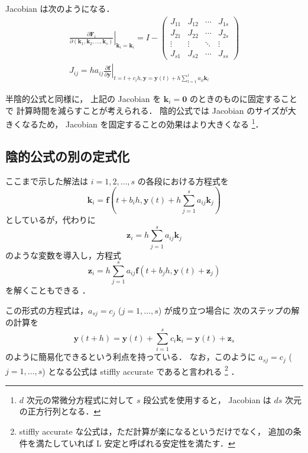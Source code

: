 Jacobian は次のようになる．
\begin{align}
    \left. \frac{\partial \bm{F}_i}{\partial (\bm{k}_1, \bm{k}_2, \ldots, \bm{k}_s)}
    \right|_{\bm{k}_i = \bm{k}_i}
    = I -
    \begin{pmatrix}
        J_{11} & J_{12} & \cdots & J_{1s} \\
        J_{21} & J_{22} & \cdots & J_{2s} \\
        \vdots & \vdots & \ddots & \vdots \\
        J_{s1} & J_{s2} & \cdots & J_{ss}
    \end{pmatrix}
    \\
    J_{ij} = h a_{ij} \left. \frac{\partial \bm{f}}{\partial \bm{y}}
    \right|_{t = t + c_i h, \bm{y} = \bm{y}(t) + h \sum_{l = 1}^i a_{il} \bm{k}_l}
\end{align}

半陰的公式と同様に，
上記の Jacobian を $\bm{k}_i = \bm{0}$ のときのものに固定することで
計算時間を減らすことが考えられる．
陰的公式では Jacobian のサイズが大きくなるため，
Jacobian を固定することの効果はより大きくなる
\footnote{$d$ 次元の常微分方程式に対して $s$ 段公式を使用すると，%
    Jacobian は $ds$ 次元の正方行列となる．}．

\subsection{陰的公式の別の定式化}\label{sec:ode_runge-kutta_another-implicit-stage-solving}

ここまで示した解法は $i = 1, 2, \ldots, s$ の各段における方程式を
\begin{equation}
    \bm{k}_i = \bm{f}\left(t + b_i h, \bm{y}(t) + h \sum_{j = 1}^s a_{ij} \bm{k}_j \right)
\end{equation}
としているが，代わりに
\begin{equation}
    \bm{z}_i = h \sum_{j = 1}^s a_{ij} \bm{k}_j
\end{equation}
のような変数を導入し，方程式
\begin{equation}
    \bm{z}_i = h \sum_{j = 1}^s a_{ij} \bm{f}\left(t + b_j h, \bm{y}(t) + \bm{z}_j \right)
    \label{eq:ode_runge-kutta_implicit-equation-for-differences}
\end{equation}
を解くこともできる \cite[Section IV.8.]{Hairer1991}．

この形式の方程式は，$a_{sj} = c_j$ ($j = 1, \ldots, s$) が成り立つ場合に
次のステップの解の計算を
\begin{equation}
    \bm{y}(t + h) = \bm{y}(t) + \sum_{i=1}^s c_i \bm{k}_i
    = \bm{y}(t) + \bm{z}_s
\end{equation}
のように簡易化できるという利点を持っている．
なお，このように $a_{sj} = c_j$ ($j = 1, \ldots, s$) となる公式は
stiffly accurate  であると言われる
\cite[Section IV.6.]{Hairer1991}
\footnote{stiffly accurate な公式は，ただ計算が楽になるというだけでなく，%
    追加の条件を満たしていれば L 安定と呼ばれる安定性を満たす\cite[Section IV.3.]{Hairer1991}．}
．

